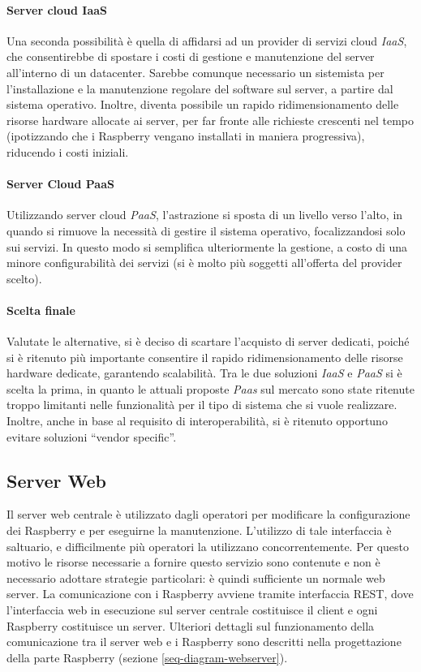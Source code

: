 \paragraph{Server cloud IaaS}
Una seconda possibilità è quella di affidarsi ad un provider di servizi cloud \textit{IaaS}, che consentirebbe di spostare i costi di gestione e manutenzione del server all'interno di un datacenter.
Sarebbe comunque necessario un sistemista per l'installazione e la manutenzione regolare del software sul server, a partire dal sistema operativo.
Inoltre, diventa possibile un rapido ridimensionamento delle risorse hardware allocate ai server, per far fronte alle richieste crescenti nel tempo (ipotizzando che i Raspberry vengano installati in maniera progressiva), riducendo i costi iniziali.
\paragraph{Server Cloud PaaS}
Utilizzando server cloud \textit{PaaS}, l'astrazione si sposta di un livello verso l'alto, in quando si rimuove la necessità di gestire il sistema operativo, focalizzandosi solo sui servizi.
In questo modo si semplifica ulteriormente la gestione, a costo di una minore configurabilità dei servizi (si è molto più soggetti all'offerta del provider scelto).
\paragraph{Scelta finale}
Valutate le alternative, si è deciso di scartare l'acquisto di server dedicati, poiché si è ritenuto più importante consentire il rapido ridimensionamento delle risorse hardware dedicate, garantendo scalabilità.
Tra le due soluzioni \textit{IaaS} e \textit{PaaS} si è scelta la prima, in quanto le attuali proposte \textit{Paas} sul mercato sono state ritenute troppo limitanti nelle funzionalità per il tipo di sistema che si vuole realizzare.
Inoltre, anche in base al requisito di interoperabilità, si è ritenuto opportuno evitare soluzioni ``vendor specific''.

\subsection{Server Web}
Il server web centrale è utilizzato dagli operatori per modificare la configurazione dei Raspberry e per eseguirne la manutenzione.
L'utilizzo di tale interfaccia è saltuario, e difficilmente più operatori la utilizzano concorrentemente.
Per questo motivo le risorse necessarie a fornire questo servizio sono contenute e non è necessario adottare strategie particolari: è quindi sufficiente un normale web server.
La comunicazione con i Raspberry avviene tramite interfaccia REST, dove l'interfaccia web in esecuzione sul server centrale costituisce il client e ogni Raspberry costituisce un server.
Ulteriori dettagli sul funzionamento della comunicazione tra il server web e i Raspberry sono descritti nella progettazione della parte Raspberry (sezione \ref{seq-diagram-webserver}).

